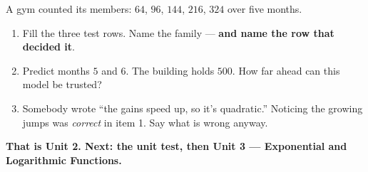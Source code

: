 \documentclass[aspectratio=169, 11pt]{beamer}
\begin{document}
\begin{frame}[t, plain]
  A gym counted its members: $64$, $96$, $144$, $216$, $324$ over five months.
  \begin{enumerate}
    \setlength{\itemsep}{0.3cm}
    \item Fill the three test rows. Name the family --- \textbf{and name the row that decided it}.
    \item Predict months $5$ and $6$. The building holds $500$. How far ahead can this model be
          trusted?
    \item Somebody wrote ``the gains speed up, so it's quadratic.'' Noticing the growing jumps was
          \emph{correct} in item 1. Say what is wrong anyway.
  \end{enumerate}
  \vspace{0.2cm}
  {\color{royal}\bfseries That is Unit 2. Next: the unit test, then Unit 3 --- Exponential and
  Logarithmic Functions.}
\end{frame}
\end{document}
